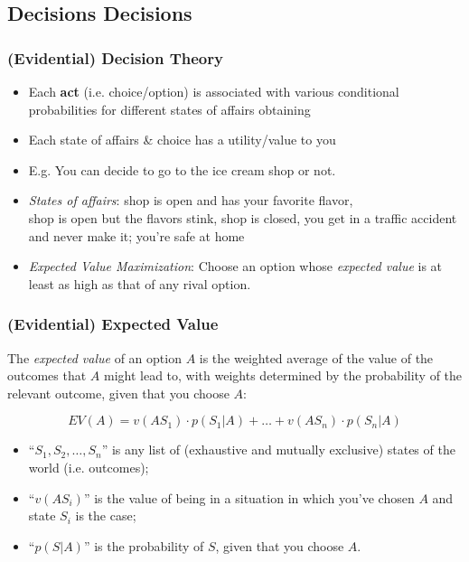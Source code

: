 \subsection{Decisions Decisions}

\begin{frame}
\frametitle{(Evidential) Decision Theory}


\begin{itemize}[<+->]

\item Each \textbf{act} (i.e. choice/option) is associated with various conditional probabilities for different states of affairs obtaining

\item Each state of affairs \& choice has a utility/value to you

\item E.g. You can decide to go to the ice cream shop or not.

\item[] \textit{States of affairs}: shop is open and has your favorite flavor, \\ shop is open but the flavors stink, shop is closed, you get in a traffic accident and never make it; you're safe at home 

\item \emph{Expected Value Maximization}: Choose an option whose \emph{expected value} is at least as high as that of any rival option.\label{gloss:evm}

\end{itemize}
\end{frame}

\begin{frame}
\frametitle{(Evidential) Expected Value}

The \emph{expected value} of an option $A$ is the weighted average of the value of the outcomes that $A$ might lead to, with weights determined by the probability of the relevant outcome, given that you choose $A$: \label{gloss:ev} 

\pause

\[
EV(A) = v(A S_1) \cdot p(S_1|{}A) + 
 \ldots + 
v(A S_n) \cdot p(S_n|{}A)
\]

\begin{itemize}[<+->]

\item ``$S_1, S_2,\ldots, S_n$'' is any list of (exhaustive and mutually exclusive) states of the world (i.e. outcomes);

\item ``$v(A S_i)$'' is the value of being in a situation in which you've chosen $A$ and state $S_i$ is the case;

\item ``$p(S|A)$'' is the probability of $S$, given that you choose $A$.\label{gloss:cond-prob5}


\end{itemize}
\end{frame}

